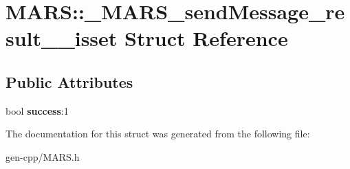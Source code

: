 \hypertarget{structMARS_1_1__MARS__sendMessage__result____isset}{}\section{M\+A\+RS\+:\+:\+\_\+\+M\+A\+R\+S\+\_\+send\+Message\+\_\+result\+\_\+\+\_\+isset Struct Reference}
\label{structMARS_1_1__MARS__sendMessage__result____isset}
\subsection*{Public Attributes}
\begin{DoxyCompactItemize}
\item 
\mbox{\label{structMARS_1_1__MARS__sendMessage__result____isset_a1382f7ec6cfb2b1a0f39cffad01517bd}} 
bool {\bfseries success}\+:1
\end{DoxyCompactItemize}


The documentation for this struct was generated from the following file\+:\begin{DoxyCompactItemize}
\item 
gen-\/cpp/M\+A\+R\+S.\+h\end{DoxyCompactItemize}
